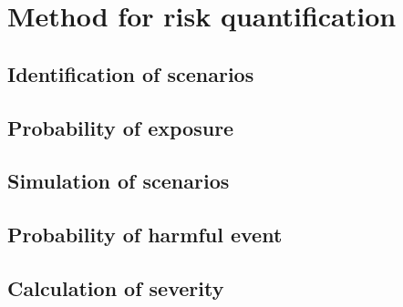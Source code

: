 \section{Method for risk quantification}
\label{sec:method}

\begin{figure*}
	\centering
	
\end{figure*}



\subsection{Identification of scenarios}
\label{sec:scenario identification}



\subsection{Probability of exposure}
\label{sec:exposure}



\subsection{Simulation of scenarios}
\label{sec:simulation}



\subsection{Probability of harmful event}
\label{sec:harmful}



\subsection{Calculation of severity}
\label{sec:severity}
